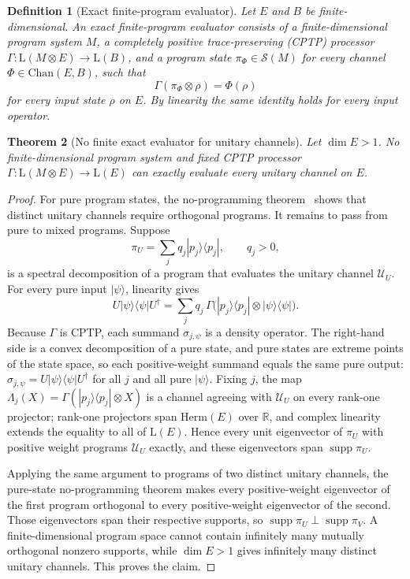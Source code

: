\documentclass[11pt,a4paper]{article}
\newtheorem{theorem}{Theorem}[section]
\newtheorem{definition}[theorem]{Definition}
\newcommand{\Lin}{\mathrm{L}}
\newcommand{\Herm}{\mathrm{Herm}}
\newcommand{\Sstate}{\mathcal{S}}
\newcommand{\Chan}{\mathrm{Chan}}
\newcommand{\supp}{\operatorname{supp}}
\begin{document}
\begin{definition}[Exact finite-program evaluator]
Let $E$ and $B$ be finite-dimensional. An exact finite-program evaluator consists of a finite-dimensional program system $M$, a completely positive trace-preserving (CPTP) processor $\Gamma:\Lin(M\otimes E)\to\Lin(B)$, and a program state $\pi_\Phi\in\Sstate(M)$ for every channel $\Phi\in\Chan(E,B)$, such that
\[
\Gamma(\pi_\Phi\otimes\rho)=\Phi(\rho)
\]
for every input state $\rho$ on $E$. By linearity the same identity holds for every input operator.
\end{definition}

\begin{theorem}[No finite exact evaluator for unitary channels]
\label{thm:no-programming}
Let $\dim E>1$. No finite-dimensional program system and fixed CPTP processor $\Gamma:\Lin(M\otimes E)\to\Lin(E)$ can exactly evaluate every unitary channel on $E$.
\end{theorem}

\begin{proof}
For pure program states, the no-programming theorem~\cite{NielsenChuang1997} shows that distinct unitary channels require orthogonal programs. It remains to pass from pure to mixed programs. Suppose
\[
\pi_U=\sum_jq_j|p_j\rangle\langle p_j|,\qquad q_j>0,
\]
is a spectral decomposition of a program that evaluates the unitary channel $\mathcal U_U$. For every pure input $|\psi\rangle$, linearity gives
\[
U|\psi\rangle\langle\psi|U^\dagger
=\sum_jq_j\,\Gamma\big(|p_j\rangle\langle p_j|\otimes|\psi\rangle\langle\psi|\big).
\]
Because $\Gamma$ is CPTP, each summand $\sigma_{j,\psi}$ is a density operator. The right-hand side is a convex decomposition of a pure state, and pure states are extreme points of the state space, so each positive-weight summand equals the same pure output: $\sigma_{j,\psi}=U|\psi\rangle\langle\psi|U^\dagger$ for all $j$ and all pure $|\psi\rangle$. Fixing $j$, the map $\Lambda_j(X)=\Gamma(|p_j\rangle\langle p_j|\otimes X)$ is a channel agreeing with $\mathcal U_U$ on every rank-one projector; rank-one projectors span $\Herm(E)$ over $\mathbb R$, and complex linearity extends the equality to all of $\Lin(E)$. Hence every unit eigenvector of $\pi_U$ with positive weight programs $\mathcal U_U$ exactly, and these eigenvectors span $\supp\pi_U$.

Applying the same argument to programs of two distinct unitary channels, the pure-state no-programming theorem makes every positive-weight eigenvector of the first program orthogonal to every positive-weight eigenvector of the second. Those eigenvectors span their respective supports, so $\supp\pi_U\perp\supp\pi_V$. A finite-dimensional program space cannot contain infinitely many mutually orthogonal nonzero supports, while $\dim E>1$ gives infinitely many distinct unitary channels. This proves the claim.
\end{proof}
\end{document}
